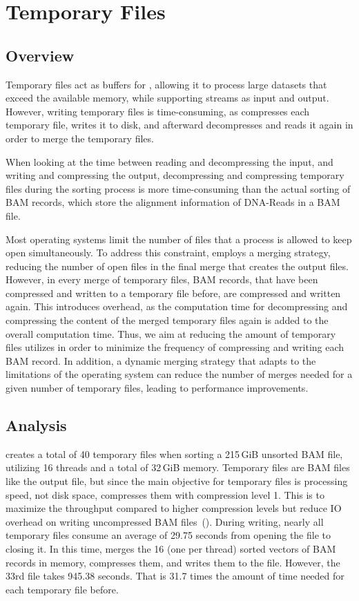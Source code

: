 \section{Temporary Files} \label{tempfiles}

\subsection{Overview}

Temporary files act as buffers for \sort, allowing it to process large datasets that exceed the available memory, while supporting streams as input and output. However, writing temporary files is time-consuming, as \sort compresses each temporary file, writes it to disk, and afterward decompresses and reads it again in order to merge the temporary files.

When looking at the time between reading and decompressing the input, and writing and compressing the output, decompressing and compressing temporary files during the sorting process is more time-consuming than the actual sorting of BAM records, which store the alignment information of DNA-Reads in a BAM file. 

Most operating systems limit the number of files that a process is allowed to keep open simultaneously. To address this constraint, \sort employs a merging strategy, reducing the number of open files in the final merge that creates the output files. However, in every merge of temporary files, BAM records, that have been compressed and written to a temporary file before, are compressed and written again. This introduces overhead, as the computation time for decompressing and compressing the content of the merged temporary files again is added to the overall computation time. Thus, we aim at reducing the amount of temporary files \sort utilizes in order to minimize the frequency of \sort compressing and writing each BAM record. In addition, a dynamic merging strategy that adapts to the limitations of the operating system can reduce the number of merges needed for a given number of temporary files, leading to performance improvements.

\subsection{Analysis}
\sort creates a total of 40 temporary files when sorting a 215\,GiB unsorted BAM file, utilizing 16 threads and a total of 32\,GiB memory. Temporary files are BAM files like the output file, but since the main objective for temporary files is processing speed, not disk space, \sort compresses them with compression level 1. This is to maximize the throughput compared to higher compression levels but reduce IO overhead on writing uncompressed BAM files~(). During writing, nearly all temporary files consume an average of 29.75 seconds from opening the file to closing it. In this time, \sort merges the 16 (one per thread) sorted vectors of BAM records in memory, compresses them, and writes them to the file. However, the 33rd file takes 945.38 seconds. That is 31.7 times the amount of time needed for each temporary file before. 

